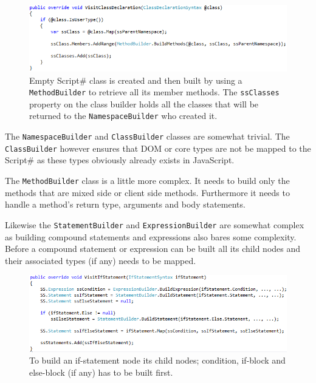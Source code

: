 	\begin{figure}[H]
		\begin{center}
			\centerline{\includegraphics[width=16cm]{resources/images/VisitClassDeclaration.png}}
		\end{center}
		\caption{Empty Script\# class is created and then built by using a \texttt{MethodBuilder} to retrieve all its member methods. The \texttt{ssClasses} property on the class builder holds all the classes that will be returned to the \texttt{NamespaceBuilder} who created it.}
		\label{visitClassDeclaration}
	\end{figure}

	The \texttt{NamespaceBuilder} and \texttt{ClassBuilder} classes are somewhat trivial. The \texttt{ClassBuilder} however ensures that DOM or core types are not be mapped to the Script\# as these types obviously already exists in JavaScript.

	The \texttt{MethodBuilder} class is a little more complex. It needs to build only the methods that are mixed side or client side methods. Furthermore it needs to handle a method’s return type, arguments and body statements. 

	Likewise the \texttt{StatementBuilder} and \texttt{ExpressionBuilder} are somewhat complex as building compound statements and expressions also bares some complexity. Before a compound statement or expression can be built all its child nodes and their associated types (if any) needs to be mapped.

	\begin{figure}[H]
		\begin{center}
			\centerline{\includegraphics[width=16cm]{resources/images/VisitIfStatement.png}}
		\end{center}
		\caption{To build an if-statement node its child nodes; condition, if-block and else-block (if any) has to be built first.}
		\label{visitIfStatement}
	\end{figure}

